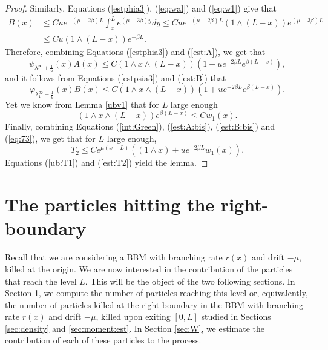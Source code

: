 \documentclass[11pt]{article}
\theoremstyle{plain}
\newcommand\linf{\lambda_1^\infty}
\begin{document}
\begin{proof}
Similarly, Equations (\ref{estphia3}), (\ref{eq:wal}) and (\ref{eq:w1}) give that 
\begin{align}
B(x)&\leqslant Cue^{-(\mu-2\beta)L}\int_x^Le^{(\mu-3\beta)y}dy\leqslant Cue^{-(\mu-2\beta)L}(1\wedge(L-x))e^{(\mu-3\beta)L}\nonumber \\
&\leqslant Cu(1\wedge(L-x))e^{-\beta L} \label{est:B}.
\end{align}
Therefore, combining Equations (\ref{estphia3}) and (\ref{est:A}), we get that 
\begin{equation}
\psi_{\linf+\frac{1}{u}}(x)A(x)\leqslant C(1\wedge x\wedge(L-x))\left(1+ue^{-2\beta L}e^{\beta(L-x)}\right)\label{est:A:bis},
\end{equation}
and it follows from Equations (\ref{estpsia3}) and (\ref{est:B}) that
\begin{equation}
\varphi_{\linf+\frac{1}{u}}(x)B(x)\leqslant C(1\wedge x\wedge(L-x))\left(1+ue^{-2\beta L}e^{\beta(L-x)}\right)\label{est:B:bis}.
\end{equation}
Yet we know from Lemma \ref{ubv1} that for $L$ large enough
\begin{equation}
(1\wedge x\wedge(L-x))e^{\beta(L-x)}\leqslant Cw_1(x).\label{eq:73}
\end{equation}
Finally, combining Equations (\ref{int:Green}), (\ref{est:A:bis}), (\ref{est:B:bis}) and (\ref{eq:73}), we get that for $L$ large enough,
\begin{equation}
T_2\leqslant Ce^{\mu(x-L)}\left((1\wedge x)+ue^{-2\beta L}w_1(x)\right).\label{est:T2}
\end{equation}
Equations (\ref{ub:T1}) and (\ref{est:T2}) yield the lemma.
\end{proof}


\section{The particles hitting the right-boundary} \label{sec:R}
\setcounter{equation}{0}
Recall that we are considering a BBM with branching rate $r(x)$ and drift $-\mu$, killed at the origin. We are now interested in the contribution of the particles that reach the level $L$. This will be the object of the two following sections. In Section \ref{sec:R}, we compute the number of particles reaching this level or, equivalently, the number of particles killed at the right boundary in the BBM with branching rate $r(x)$ and drift $-\mu$, killed upon exiting $[0,L]$ studied in Sections \ref{sec:density} and \ref{sec:moment:est}. In Section \ref{sec:W}, we estimate the contribution of each of these particles to the process.
\end{document}

